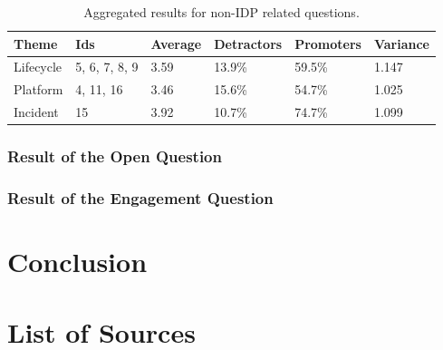 \documentclass[a4paper,12pt]{article}
\begin{document}
    \begin{table}[!htbp]
        \begin{center}
            \begin{tabularx}{\textwidth}{llllll}
                \toprule
                Theme     & Ids           & Average & Detractors & Promoters & Variance \\
                \midrule
                Lifecycle & 5, 6, 7, 8, 9 & 3.59    & 13.9\%     & 59.5\%    & 1.147    \\
                Platform  & 4, 11, 16     & 3.46    & 15.6\%     & 54.7\%    & 1.025    \\
                Incident  & 15            & 3.92    & 10.7\%     & 74.7\%    & 1.099    \\
                \bottomrule
            \end{tabularx}
        \end{center}
        \caption{\label{tab:nonidpresults} Aggregated results for non-IDP related questions.}
    \end{table}

    \subsubsection{Result of the Open Question}
    \label{sssec:ropque}


    \subsubsection{Result of the Engagement Question}
    \label{sssec:rengque}


    \section{Conclusion}
    \label{sec:conclusion}
    \pagebreak


    \section{List of Sources}
    \label{sec:bibliograhpy}
    \printbibliography[heading=none]
\end{document}
